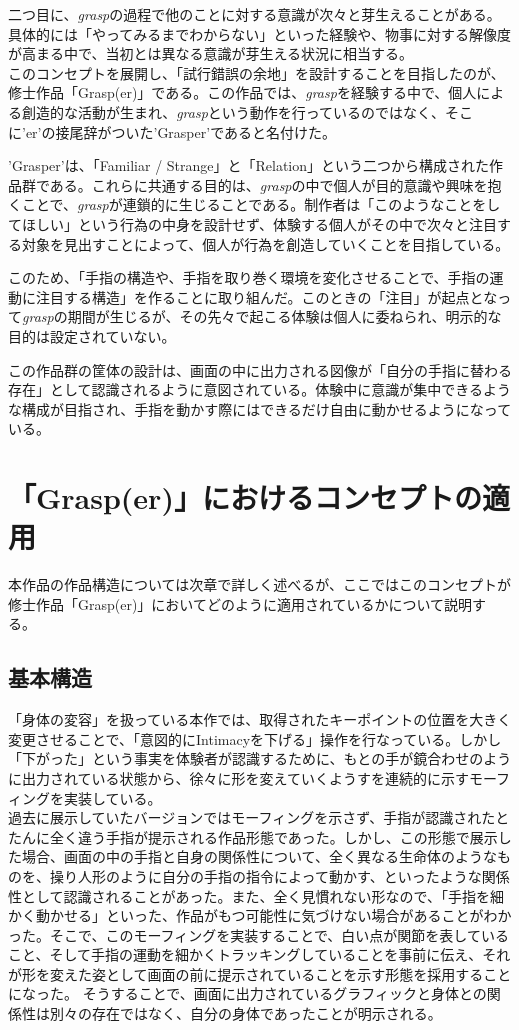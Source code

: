 二つ目に、\textit{grasp}の過程で他のことに対する意識が次々と芽生えることがある。具体的には「やってみるまでわからない」といった経験や、物事に対する解像度が高まる中で、当初とは異なる意識が芽生える状況に相当する。\\

このコンセプトを展開し、「試行錯誤の余地」を設計することを目指したのが、修士作品「Grasp(er)」である。この作品では、\textit{grasp}を経験する中で、個人による創造的な活動が生まれ、\textit{grasp}という動作を行っているのではなく、そこに'er'の接尾辞がついた'Grasper'であると名付けた。

'Grasper'は、「Familiar / Strange」と「Relation」という二つから構成された作品群である。これらに共通する目的は、\textit{grasp}の中で個人が目的意識や興味を抱くことで、\textit{grasp}が連鎖的に生じることである。制作者は「このようなことをしてほしい」という行為の中身を設計せず、体験する個人がその中で次々と注目する対象を見出すことによって、個人が行為を創造していくことを目指している。

このため、「手指の構造や、手指を取り巻く環境を変化させることで、手指の運動に注目する構造」を作ることに取り組んだ。このときの「注目」が起点となって\textit{grasp}の期間が生じるが、その先々で起こる体験は個人に委ねられ、明示的な目的は設定されていない。

この作品群の筐体の設計は、画面の中に出力される図像が「自分の手指に替わる存在」として認識されるように意図されている。体験中に意識が集中できるような構成が目指され、手指を動かす際にはできるだけ自由に動かせるようになっている。

\section{「Grasp(er)」におけるコンセプトの適用}
本作品の作品構造については次章で詳しく述べるが、ここではこのコンセプトが修士作品「Grasp(er)」においてどのように適用されているかについて説明する。\\
\subsection{基本構造}
「身体の変容」を扱っている本作では、取得されたキーポイントの位置を大きく変更させることで、「意図的にIntimacyを下げる」操作を行なっている。しかし「下がった」という事実を体験者が認識するために、もとの手が鏡合わせのように出力されている状態から、徐々に形を変えていくようすを連続的に示すモーフィングを実装している。\\
過去に展示していたバージョンではモーフィングを示さず、手指が認識されたとたんに全く違う手指が提示される作品形態であった。しかし、この形態で展示した場合、画面の中の手指と自身の関係性について、全く異なる生命体のようなものを、操り人形のように自分の手指の指令によって動かす、といったような関係性として認識されることがあった。また、全く見慣れない形なので、「手指を細かく動かせる」といった、作品がもつ可能性に気づけない場合があることがわかった。そこで、このモーフィングを実装することで、白い点が関節を表していること、そして手指の運動を細かくトラッキングしていることを事前に伝え、それが形を変えた姿として画面の前に提示されていることを示す形態を採用することになった。
そうすることで、画面に出力されているグラフィックと身体との関係性は別々の存在ではなく、自分の身体であったことが明示される。\\

